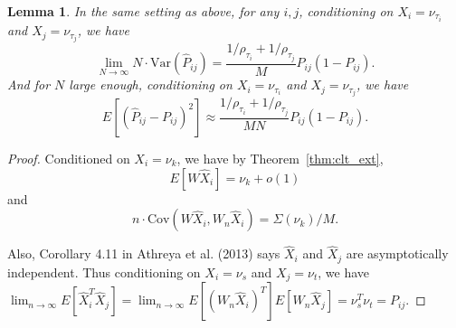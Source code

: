 \documentclass[10pt,letterpaper]{article}
\newtheorem{lemma}[fact]{Lemma}
\begin{document}
\begin{lemma}
\label{lm:VarPhat}
In the same setting as above, for any $i, j$, conditioning on $X_i = \nu_{\tau_i}$ and $X_j = \nu_{\tau_j}$, we have
\[
	\lim_{N \to \infty} N \cdot \mathrm{Var}(\hat{P}_{ij}) =
    \frac{1/\rho_{\tau_i} + 1/\rho_{\tau_j}}{M} P_{ij} (1 - P_{ij}).
\]
And for $N$ large enough, conditioning on $X_i = \nu_{\tau_i}$ and $X_j = \nu_{\tau_j}$, we have
\[
	E[(\hat{P}_{ij} - P_{ij})^2] \approx
    \frac{1/\rho_{\tau_i} + 1/\rho_{\tau_j}}{M N} P_{ij}(1-P_{ij}).
\]
\end{lemma}
\begin{proof}
Conditioned on $X_i = \nu_k$, we have by Theorem~\ref{thm:clt_ext},
\[
	E[W \hat{X}_i] = \nu_k+o(1)
\]
and
\[
	n \cdot \mathrm{Cov}(W \hat{X}_i, W_n \hat{X}_i) = \Sigma(\nu_k)/M.
\]


Also, Corollary 4.11 in Athreya et al. (2013) says $\hat{X}_i$ and $\hat{X}_j$ are asymptotically independent. Thus conditioning on $X_i = \nu_s$ and $X_j = \nu_t$, we have $\lim_{n\to\infty}E[\hat{X}_i^T \hat{X}_j] = \lim_{n\to\infty}E[(W_n \hat{X}_i)^T] E[W_n \hat{X}_j] = \nu_s^T \nu_t = P_{ij}$.


\end{proof}
\end{document}
